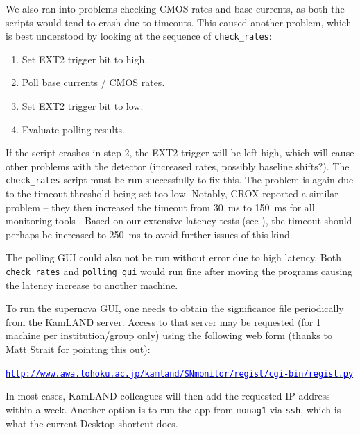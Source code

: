 \documentclass[a4paper,10pt]{article}
\newcommand{\link}[1]{\href{#1}{\textcolor{blue}{\texttt{#1}}}} %
\begin{document}
We also ran into problems checking CMOS rates and base currents, as both the scripts would tend to crash due to timeouts. This caused another problem, which is best understood by looking at the sequence of {\tt check\_rates}:
\begin{enumerate}
	\item Set EXT2 trigger bit to high.
	\item Poll base currents / CMOS rates.
	\item Set EXT2 trigger bit to low.
	\item Evaluate polling results.
\end{enumerate}
If the script crashes in step 2, the EXT2 trigger will be left high, which will cause other problems with the detector (increased rates, possibly baseline shifts?). The {\tt check\_rates} script must be run successfully to fix this. The problem is again due to the timeout threshold being set too low. Notably, CROX reported a similar problem -- they then increased the timeout from 30~ms to 150~ms for all monitoring tools \cite{doc5051}. Based on our extensive latency tests (see ), the timeout should perhaps be increased to 250~ms to avoid further issues of this kind.

The polling GUI could also not be run without error due to high latency. Both {\tt check\_rates} and {\tt polling\_gui} would run fine after moving the programs causing the latency increase to another machine.

To run the supernova GUI, one needs to obtain the significance file periodically from the KamLAND server. Access to that server may be requested (for 1 machine per institution/group only) using the following web form (thanks to Matt Strait for pointing this out):

\qquad\link{http://www.awa.tohoku.ac.jp/kamland/SNmonitor/regist/cgi-bin/regist.py}

In most cases, KamLAND colleagues will then add the requested IP address within a week.
Another option is to run the app from {\tt monag1} via {\tt ssh}, which is what the current Desktop shortcut does.

\end{document}
